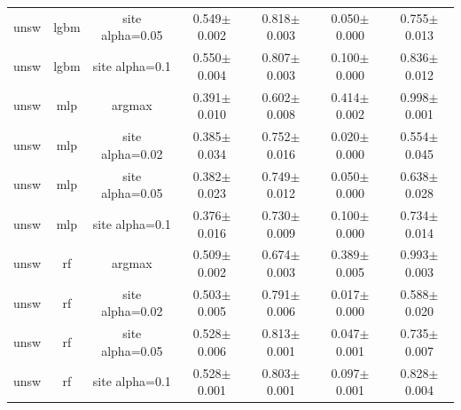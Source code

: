 \begin{tabular}{lcccccc}
unsw & lgbm & site alpha=0.05 & 0.549$\pm$0.002 & 0.818$\pm$0.003 & 0.050$\pm$0.000 & 0.755$\pm$0.013 \\
unsw & lgbm & site alpha=0.1 & 0.550$\pm$0.004 & 0.807$\pm$0.003 & 0.100$\pm$0.000 & 0.836$\pm$0.012 \\
unsw & mlp & argmax & 0.391$\pm$0.010 & 0.602$\pm$0.008 & 0.414$\pm$0.002 & 0.998$\pm$0.001 \\
unsw & mlp & site alpha=0.02 & 0.385$\pm$0.034 & 0.752$\pm$0.016 & 0.020$\pm$0.000 & 0.554$\pm$0.045 \\
unsw & mlp & site alpha=0.05 & 0.382$\pm$0.023 & 0.749$\pm$0.012 & 0.050$\pm$0.000 & 0.638$\pm$0.028 \\
unsw & mlp & site alpha=0.1 & 0.376$\pm$0.016 & 0.730$\pm$0.009 & 0.100$\pm$0.000 & 0.734$\pm$0.014 \\
unsw & rf & argmax & 0.509$\pm$0.002 & 0.674$\pm$0.003 & 0.389$\pm$0.005 & 0.993$\pm$0.003 \\
unsw & rf & site alpha=0.02 & 0.503$\pm$0.005 & 0.791$\pm$0.006 & 0.017$\pm$0.000 & 0.588$\pm$0.020 \\
unsw & rf & site alpha=0.05 & 0.528$\pm$0.006 & 0.813$\pm$0.001 & 0.047$\pm$0.001 & 0.735$\pm$0.007 \\
unsw & rf & site alpha=0.1 & 0.528$\pm$0.001 & 0.803$\pm$0.001 & 0.097$\pm$0.001 & 0.828$\pm$0.004 \\
\bottomrule
\end{tabular}

